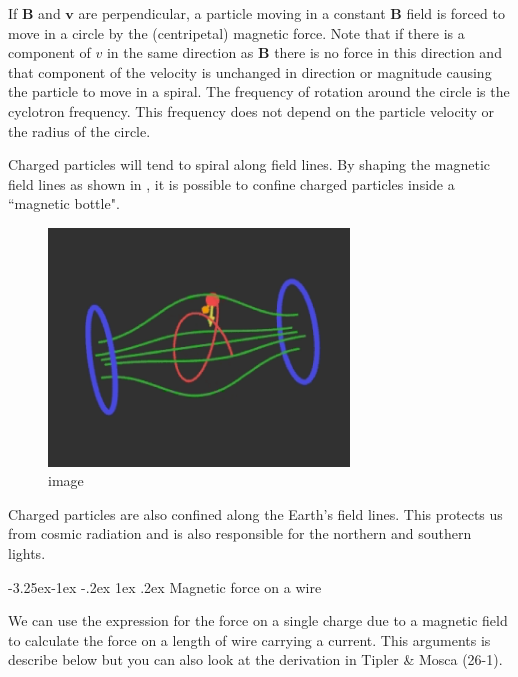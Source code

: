 \documentclass[
]{book}
\makeatletter
\renewcommand\subsection{%
\@startsection{subsection}{2}{\z@}%
              {-3.25ex\@plus -1ex \@minus -.2ex}%
              {1ex \@plus .2ex}%
              {\sffamily\bfseries}}
\numberwithin{equation}{section}
\makeatother
\begin{document}
If \(\mathbf{B}\) and \(\mathbf{v}\) are perpendicular, a particle moving in a constant \(\mathbf{B}\)
field is forced to move in a circle by the (centripetal) magnetic force.
Note that if there is a component of \(v\) in the same direction as \(\mathbf{B}\)
there is no force in this direction and that component of the velocity
is unchanged in direction or magnitude causing the particle to move in a
spiral. The frequency of rotation around the circle is the cyclotron
frequency. This frequency does not depend on the particle velocity or
the radius of the circle.

Charged particles will tend to spiral along field lines. By shaping the
magnetic field lines as shown in , it is possible to confine charged
particles inside a ``magnetic bottle".

\begin{figure}
\centering
\includegraphics[width=80mm,height=\textheight]{Figures/magBottle.png}
\caption{image}
\end{figure}

Charged particles are also confined along the Earth's field lines. This
protects us from cosmic radiation and is also responsible for the
northern and southern lights.

\hypertarget{magnetic-force-on-a-wire}{%
\subsection{Magnetic force on a wire}\label{magnetic-force-on-a-wire}}

We can use the expression for the force on a single charge due to a
magnetic field to calculate the force on a length of wire carrying a
current. This arguments is describe below but you can also look at the
derivation in Tipler \& Mosca (26-1).
\end{document}
